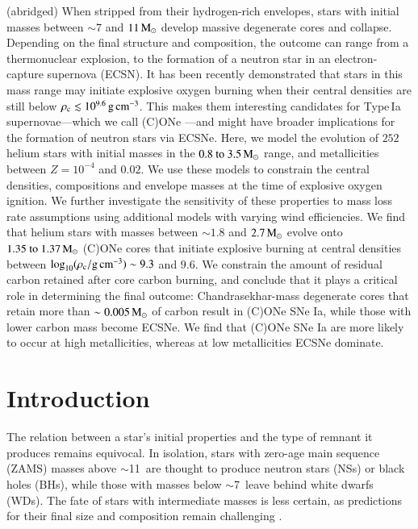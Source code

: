 \documentclass[main.tex]{subfiles}
\begin{document}
    (abridged) When stripped from their hydrogen-rich envelopes, stars with initial masses between $\sim 7$ and $11\mathrm{\,M_\odot}$ develop massive degenerate cores and collapse. Depending on the final structure and composition, the outcome can range from a thermonuclear explosion, to the formation of a neutron star in an electron-capture supernova (ECSN). It has been recently demonstrated that stars in this mass range may initiate explosive oxygen burning when their central densities are still below $\rho_{\mathrm{c}} \lesssim 10^{9.6}\mathrm{\,g\,cm^{-3}}$. This makes them interesting candidates for Type\,Ia supernovae---which we call (C)ONe \ias---and might have broader implications for the formation of neutron stars via ECSNe. Here, we model the evolution of $252$ helium stars with initial masses in the $\numrange{0.8}{3.5}\msun$ range, and metallicities between $Z=10^{-4}$ and $0.02$. We use these models to constrain the central densities, compositions and envelope masses at the time of explosive oxygen ignition. We further investigate the sensitivity of these properties to mass loss rate assumptions using additional models with varying wind efficiencies. We find that helium stars with masses between $\sim1.8$ and $2.7\mathrm{\,M_\odot}$ evolve onto $\numrange{1.35}{1.37}\msun$ (C)ONe cores that initiate explosive burning at central densities between $\log_{10} (\rho_{\mathrm{c}}/ \mathrm{g\,cm^{-3}}) \sim 9.3$ and $9.6$. We constrain the amount of residual carbon retained after core carbon burning, and conclude that it plays a critical role in determining the final outcome: Chandrasekhar-mass degenerate cores that retain more than $\sim 0.005\mathrm{\,M_\odot}$ of carbon result in (C)ONe SNe Ia, while those with lower carbon mass become ECSNe. We find that (C)ONe SNe Ia are more likely to occur at high metallicities, whereas at low metallicities ECSNe dominate.

    
    {
        \minitoc
        \newpage
    }
    
    
\section{Introduction} \label{sec:intro}

The relation between a star's initial properties and the type of remnant it produces remains equivocal.  In isolation, stars with zero-age main sequence 
(ZAMS)  masses above $\sim $11\msun\ are  thought to produce 
neutron stars (NSs) or black holes (BHs), while those with 
masses below $\sim$7\msun\ leave behind white dwarfs (WDs). The 
fate of stars with intermediate masses is less certain, as 
predictions for their final size and composition remain  
challenging \citep[][and references therein]{dec07:siess, Poelarends:2007ip, doherty2015, Farmer:2015afs}. 
\end{document}
